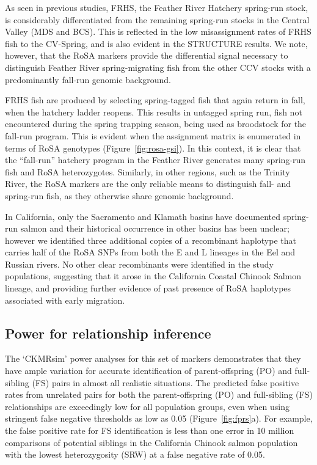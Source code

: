 As seen in previous studies, FRHS, the Feather River Hatchery
spring-run stock, is considerably differentiated from the remaining spring-run
stocks in the Central Valley (MDS and BCS). This is reflected in the low
misassignment rates of FRHS fish to the CV-Spring, and is also evident in the
STRUCTURE results.   We note, however, that the RoSA markers provide
the differential signal necessary to distinguish
Feather River spring-migrating fish from the other CCV stocks with a predominantly fall-run
genomic background. 

FRHS fish are produced by selecting spring-tagged fish that again return in fall, 
when the hatchery ladder reopens. This results in untagged spring run, fish not 
encountered during the spring trapping season, being used as broodstock for the fall-run program.
This is evident when the assignment matrix is enumerated in
terms of RoSA genotypes (Figure~\ref{fig:rosa-gsi}). In this context, it is clear that the ``fall-run'' hatchery
program in the Feather River generates many spring-run fish and RoSA heterozygotes.
Similarly, in other regions, such as the Trinity River, the RoSA markers are the only reliable means to distinguish fall-
and spring-run fish, as they otherwise share genomic background.

In California, only the Sacramento and  Klamath basins have documented spring-run
salmon and their historical occurrence in other basins has been unclear; however
we identified three additional copies of a
recombinant haplotype that carries half of the RoSA SNPs from both the E and L lineages in the Eel and Russian rivers. No other clear recombinants were identified in the study populations, suggesting that it arose in the California Coastal Chinook Salmon lineage, and providing further evidence of past presence of RoSA haplotypes associated with early migration.





\subsection*{Power for relationship inference}

The `CKMRsim' power analyses for this set of markers demonstrates that they have ample variation
for accurate identification of parent-offspring (PO) and full-sibling (FS) pairs in almost all
realistic situations. The predicted false positive rates from unrelated pairs for both the
parent-offspring (PO) and full-sibling (FS) relationships are
exceedingly low for all population groups, even when using stringent false negative thresholds as
low as 0.05 (Figure~\ref{fig:fprs}a).
For example, the false positive rate for FS identification is less than one error in 10 million
comparisons of potential siblings in the California Chinook salmon population with the lowest
heterozygosity (SRW) at a false negative rate of 0.05. 

